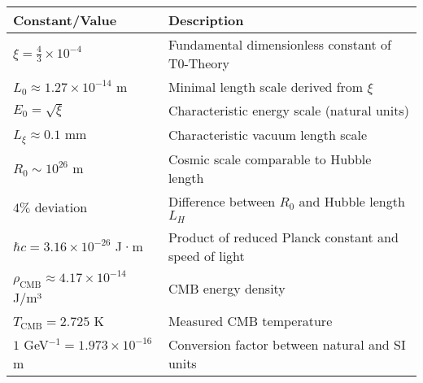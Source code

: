 \documentclass[12pt,a4paper]{article}
\numberwithin{equation}{section}
\begin{document}
	\begin{longtable}{p{4cm} p{10cm}}
		\toprule
		\textbf{Constant/Value} & \textbf{Description} \\
		\midrule
		\endhead
		
		$\xi = \frac{4}{3} \times 10^{-4}$ & Fundamental dimensionless constant of T0-Theory \\
		$L_0 \approx 1.27 \times 10^{-14}$ m & Minimal length scale derived from $\xi$ \\
		$E_0 = \sqrt{\xi}$ & Characteristic energy scale (natural units) \\
		$L_\xi \approx 0.1$ mm & Characteristic vacuum length scale \\
		$R_0 \sim 10^{26}$ m & Cosmic scale comparable to Hubble length \\
		$4\%$ deviation & Difference between $R_0$ and Hubble length $L_H$ \\
		$\hbar c = 3.16 \times 10^{-26}$ J·m & Product of reduced Planck constant and speed of light \\
		$\rho_{\text{CMB}} \approx 4.17 \times 10^{-14}$ J/m³ & CMB energy density \\
		$T_{\text{CMB}} = 2.725$ K & Measured CMB temperature \\
		$1$ GeV$^{-1} = 1.973 \times 10^{-16}$ m & Conversion factor between natural and SI units \\
		\bottomrule
	\end{longtable}
	
\end{document}

